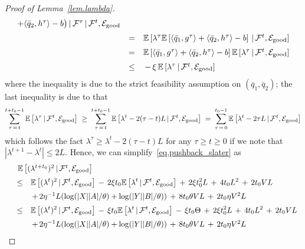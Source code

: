 \documentclass[12pt, final]{l4dc2023}
\begin{document}
\begin{proof}[Proof of Lemma~\ref{lem.lambda}]
\[\begin{array}{rcl}
{{			+ \langle{ \bar q_2},{h^{\tau}}\rangle -b\big) \,\vert\, {\mathcal{F}}^{\tau} } \,\vert\, {\mathcal{F}}^{t}, \mathcal{E}_{\text{good}} }
	\\[0.2cm]
	&=&
	\mathbb{E} \left[ \lambda^{\tau}  \mathbb{E} \left[ \langle{ \bar q_1},{g^{\tau}}\rangle 
			+ \langle{ \bar q_2},{h^{\tau}}\rangle -b\right] \,\vert\, {\mathcal{F}}^{t}, \mathcal{E}_{\text{good}}  \right]
	\\[0.2cm]
	&=&
	\mathbb{E} \left[ \langle{ \bar q_1},{g^{\tau}}\rangle 
		+ \langle{ \bar q_2},{h^{\tau}}\rangle -b \right] 
	\mathbb{E} \left[ \lambda^{\tau}  \,\vert\, {\mathcal{F}}^{t}, \mathcal{E}_{\text{good}} \right]
	\\[0.2cm]
	&\leq & \,-\,\xi \,	\mathbb{E}\left[ \lambda^{\tau}  \,\vert\, {\mathcal{F}}^{t}, \mathcal{E}_{\text{good}} \right]
	\end{array}
	\]
	where the inequality is due to the strict feasibility assumption on $(\bar q_1,\bar q_2)$; the last inequality is due to that 
	\[
	\sum_{\tau\,=\,t}^{t+t_0-1} 
	\mathbb{E}\left[ \lambda^{\tau}  \,\vert\, {\mathcal{F}}^{t}, \mathcal{E}_{\text{good}} \right] 
	\;\geq\;
	\sum_{\tau\,=\,t}^{t+t_0-1} 
	\mathbb{E}\left[  \lambda^t - 2(\tau-t)L \,\vert\, {\mathcal{F}}^{t}, \mathcal{E}_{\text{good}} \right] 
	\;=\;
	\sum_{\tau\,=\,0}^{t_0-1} 
	\mathbb{E}\left[  \lambda^t - 2\tau L \,\vert\, {\mathcal{F}}^{t}, \mathcal{E}_{\text{good}} \right] 
	\]
	which follows the fact $\lambda^\tau\geq \lambda^t - 2(\tau-t)L$ for any $\tau\geq t\geq 0$ if we note that $|\lambda^{t+1}  - \lambda^{t} | \leq 2L$.
	Hence, we can simplify~\eqref{eq.pushback_slater} as
	\[
	\begin{array}{rcl}
	&& \!\!\!\! \!\!\!\! \!\! \mathbb{E} \sbr{ (\lambda^{t+t_0})^2 \,\vert\, \calF^{t}, \mathcal{E}_{\text{good}} }
	\\[0.2cm]
	& \leq & \displaystyle \mathbb{E} \sbr{ (\lambda^{t})^2\,\vert\, \calF^{t}, \mathcal{E}_{\text{good}} }
	\,-\,2\xi t_0 \mathbb{E} \sbr{\lambda^t \,\vert\, \calF^{t}, \mathcal{E}_{\text{good}} }
	\,+\,2 \xi t_0^2L
	\,+\,4t_0L^2
	\,+\, 2t_0 VL
	\\[0.2cm]
	&& \,+\, 2\eta^{-1} L(\log(|X||A|/\theta)+\log(|Y||B|/\theta))
	\,+\,8t_0\theta V L\,+\,2t_0\eta V^2 L
	\\[0.2cm]
	& \leq & \displaystyle \mathbb{E} \sbr{(\lambda^{t})^2\,\vert\, \calF^{t}, \mathcal{E}_{\text{good}} }
	\,-\,\xi t_0 \mathbb{E} \sbr{\lambda^t \,\vert\, \calF^{t}, \mathcal{E}_{\text{good}} }
	\,-\,\xi t_0\Theta
	\,+\,2 \xi t_0^2L
	\,+\,4t_0L^2
	\,+\, 2t_0 VL
	\\[0.2cm]
	&& \,+\, 2\eta^{-1} L(\log(|X||A|/\theta)+\log(|Y||B|/\theta))
	\,+\,8t_0\theta V L\,+\,2t_0\eta V^2 L

\end{array}\]
\end{proof}
\end{document}
